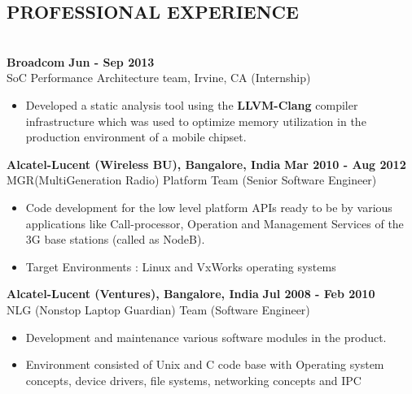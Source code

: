 \documentclass{system}
\begin{document}
\begin{resume}
\vspace{0.2in} 
\section{{PROFESSIONAL EXPERIENCE}} 
\hrulefill \\
{\bfseries Broadcom} \hfill         {\bfseries Jun - Sep 2013} \\
SoC Performance Architecture team, Irvine, CA       \hfill   (Internship)
  
   \begin{itemize} \itemsep 2pt %
   \item Developed a static analysis tool using the {\bfseries LLVM-Clang} compiler
   infrastructure which was used to optimize memory
   utilization in the production environment of a mobile chipset.
 \end{itemize}
{\bfseries   Alcatel-Lucent (Wireless BU), Bangalore, India} \hfill
{\bfseries Mar 2010 - Aug 2012} \\
MGR(MultiGeneration Radio) Platform Team \hfill (Senior Software Engineer)

 \begin{itemize} \itemsep 2pt
  \item  Code development for the low level platform APIs ready to be by
  various applications like Call-processor, Operation and Management Services
  of the 3G base stations (called as NodeB). 
  \item  Target Environments : Linux and VxWorks operating systems 
\end{itemize} \vspace{-6pt}

{\bfseries   Alcatel-Lucent (Ventures), Bangalore, India} \hfill    {\bfseries
Jul 2008 - Feb 2010} \\
NLG (Nonstop Laptop Guardian) Team \hfill (Software Engineer)
 \begin{itemize} \itemsep 2pt
 \item Development and maintenance various
software modules in the product.
 \item Environment consisted of Unix and C code base with Operating system concepts, device drivers, file
 systems, networking concepts and IPC
\end{itemize} \vspace{-6pt}
\vspace{0.2in} 


\end{resume}
\end{document}
